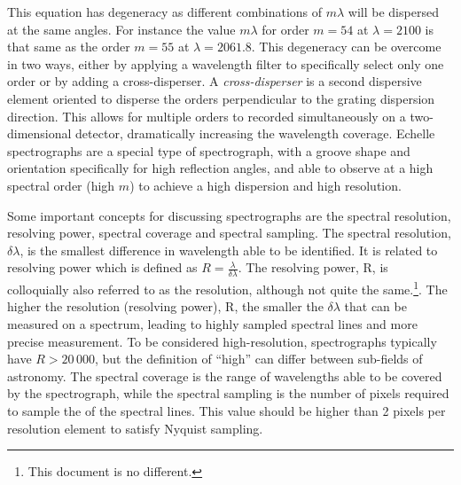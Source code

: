 This equation has degeneracy as different combinations of \(m \lambda\) will be dispersed at the same angles.
For instance the value \(m \lambda\) for order \(m=54\) at \(\lambda=2100\)\nm{} is that same as the order \(m=55\) at \(\lambda=2061.8\)\nm{}.
This degeneracy can be overcome in two ways, either by applying a wavelength filter to specifically select only one order or by adding a cross-disperser.
A \emph{cross-disperser} is a second dispersive element oriented to disperse the orders perpendicular to the grating dispersion direction.
This allows for multiple orders to recorded simultaneously on a two-dimensional detector, dramatically increasing the wavelength coverage.
Echelle spectrographs are a special type of spectrograph, with a groove shape and orientation specifically for high reflection angles, and able to observe at a high spectral order (high \(m\)) to achieve a high dispersion and high resolution.

Some important concepts for discussing spectrographs are the spectral resolution, resolving power, spectral coverage and spectral sampling.
The spectral resolution, \(\delta \lambda\), is the smallest difference in wavelength able to be identified.
It is related to resolving power which is defined as \(R=\frac{\lambda}{\delta\lambda}\).
The resolving power, R, is colloquially also referred to as the resolution, although not quite the same.\footnote{This document is no different.}.
The higher the resolution (resolving power), R, the smaller the \(\delta\lambda\) that can be measured on a spectrum, leading to highly sampled spectral lines and more precise measurement.
To be considered high-resolution, spectrographs typically have \(R>20\,000\), but the definition of ``high'' can differ between sub-fields of astronomy.
The spectral coverage is the range of wavelengths able to be covered by the spectrograph, while the spectral sampling is the number of pixels required to sample the \fwhm{} of the spectral lines.
This value should be higher than 2 pixels per resolution element to satisfy Nyquist sampling. 

